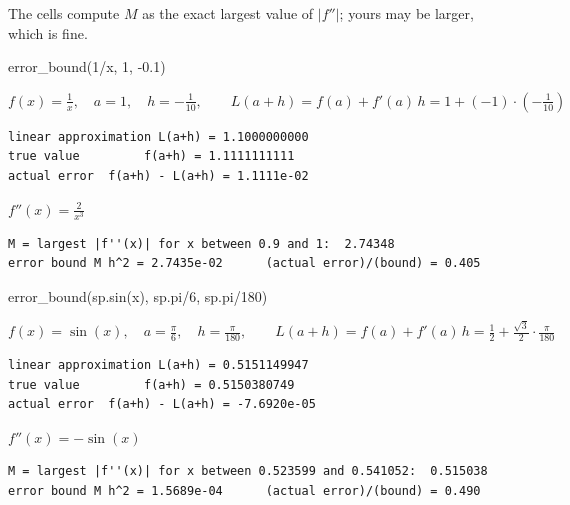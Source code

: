 \documentclass[
  letterpaper,
  DIV=11,
  numbers=noendperiod]{scrreprt}
\newenvironment{Shaded}{\begin{snugshade}}{\end{snugshade}}
\newcommand{\DecValTok}[1]{\textcolor[rgb]{0.68,0.00,0.00}{#1}}
\newcommand{\FloatTok}[1]{\textcolor[rgb]{0.68,0.00,0.00}{#1}}
\newcommand{\NormalTok}[1]{\textcolor[rgb]{0.00,0.23,0.31}{#1}}
\newcommand{\OperatorTok}[1]{\textcolor[rgb]{0.37,0.37,0.37}{#1}}
\theoremstyle{plain}
\theoremstyle{plain}
\theoremstyle{definition}
\theoremstyle{definition}
\theoremstyle{definition}
\theoremstyle{plain}
\theoremstyle{plain}
\theoremstyle{remark}
\begin{document}
The cells compute \(M\) as the exact largest value of
\(\lvert f''\rvert\); yours may be larger, which is fine.

\begin{Shaded}
\begin{Highlighting}[]
\NormalTok{error\_bound(}\DecValTok{1}\OperatorTok{/}\NormalTok{x, }\DecValTok{1}\NormalTok{, }\OperatorTok{{-}}\FloatTok{0.1}\NormalTok{)}
\end{Highlighting}
\end{Shaded}

$\displaystyle f(x) = \frac{1}{x},\quad a = 1,\quad h = - \frac{1}{10},\qquad L(a+h) = f(a) + f'(a)\,h = 1 + \left(-1\right)\cdot\left(- \frac{1}{10}\right)$

\begin{verbatim}
linear approximation L(a+h) = 1.1000000000
true value         f(a+h) = 1.1111111111
actual error  f(a+h) - L(a+h) = 1.1111e-02
\end{verbatim}

$\displaystyle f''(x) = \frac{2}{x^{3}}$

\begin{verbatim}
M = largest |f''(x)| for x between 0.9 and 1:  2.74348
error bound M h^2 = 2.7435e-02      (actual error)/(bound) = 0.405
\end{verbatim}

\begin{Shaded}
\begin{Highlighting}[]
\NormalTok{error\_bound(sp.sin(x), sp.pi}\OperatorTok{/}\DecValTok{6}\NormalTok{, sp.pi}\OperatorTok{/}\DecValTok{180}\NormalTok{)}
\end{Highlighting}
\end{Shaded}

$\displaystyle f(x) = \sin{\left(x \right)},\quad a = \frac{\pi}{6},\quad h = \frac{\pi}{180},\qquad L(a+h) = f(a) + f'(a)\,h = \frac{1}{2} + \frac{\sqrt{3}}{2}\cdot\frac{\pi}{180}$

\begin{verbatim}
linear approximation L(a+h) = 0.5151149947
true value         f(a+h) = 0.5150380749
actual error  f(a+h) - L(a+h) = -7.6920e-05
\end{verbatim}

$\displaystyle f''(x) = - \sin{\left(x \right)}$

\begin{verbatim}
M = largest |f''(x)| for x between 0.523599 and 0.541052:  0.515038
error bound M h^2 = 1.5689e-04      (actual error)/(bound) = 0.490
\end{verbatim}
\end{document}
